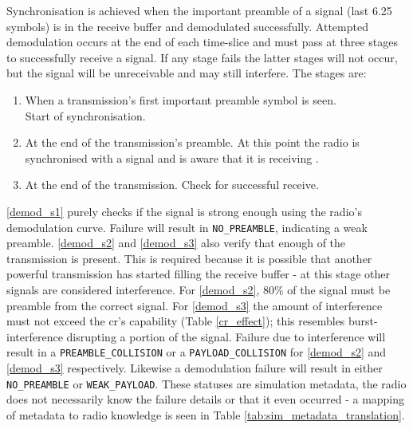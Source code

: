 Synchronisation is achieved when the important preamble of a signal (last 6.25 symbols) is in the receive buffer and demodulated successfully. Attempted demodulation occurs at the end of each time-slice and must pass at three stages to successfully receive a signal. If any stage fails the latter stages will not occur, but the signal will be unreceivable and may still interfere. The stages are:
\vspace{-2mm}
\begin{enumerate}[label=\textbf{S\arabic*}]
  	\item {When a transmission's first important preamble symbol is seen.	 \\Start of synchronisation.} \label{demod_s1}
  	\item {At the end of the transmission's preamble. At this point the radio is synchronised with a signal and is aware that it is receiving \cite{3YP:LORA_SX12}.} \label{demod_s2} 
  	\item {At the end of the transmission. Check for successful receive.} \label{demod_s3} 
\end{enumerate}
\vspace{-2mm}

\ref{demod_s1} purely checks if the signal is strong enough using the radio's demodulation curve. Failure will result in \texttt{NO\_PREAMBLE}, indicating a weak preamble. \ref{demod_s2} and \ref{demod_s3} also verify that enough of the transmission is present. This is required because it is possible that another powerful transmission has started filling the receive buffer - at this stage other signals are considered interference. For \ref{demod_s2}, 80\% of the signal must be preamble from the correct signal. For \ref{demod_s3} the amount of interference must not exceed the \ac{cr}'s capability (Table \ref{cr_effect}); this resembles burst-interference disrupting a portion of the signal. Failure due to interference will result in a \texttt{PREAMBLE\_COLLISION} or a \texttt{PAYLOAD\_COLLISION} for \ref{demod_s2} and \ref{demod_s3} respectively. Likewise a demodulation failure will result in either \texttt{NO\_PREAMBLE} or \texttt{WEAK\_PAYLOAD}. These statuses are simulation metadata, the radio does not necessarily know the failure details or that it even occurred - a mapping of metadata to radio knowledge is seen in Table \ref{tab:sim_metadata_translation}.

